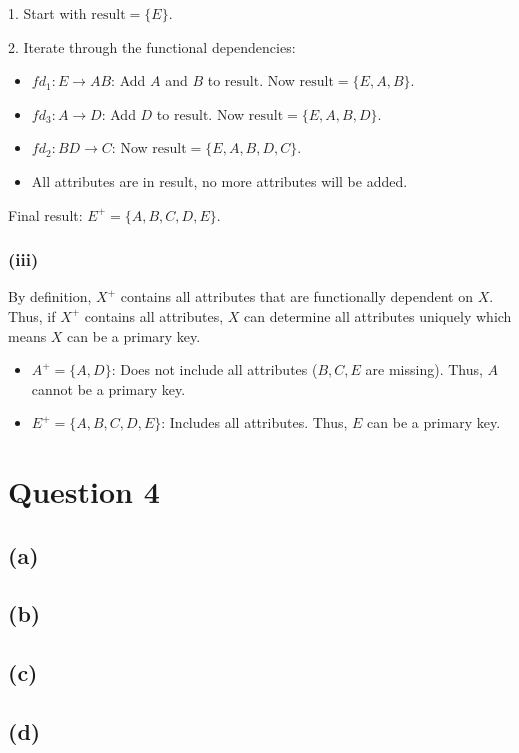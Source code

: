 \documentclass{article}
\begin{document}
1. Start with $ \text{result} = \{E\} $.

2. Iterate through the functional dependencies:
\begin{itemize}
  \item $ fd_1: E \to AB $: Add $ A $ and $ B $ to $ \text{result} $. Now $ \text{result} = \{E, A, B\} $.
  \item $ fd_3: A \to D $: Add $ D $ to $ \text{result} $. Now $ \text{result} = \{E, A, B, D\} $.
  \item $ fd_2: BD \to C $: Now $ \text{result} = \{E, A, B, D, C\} $.
  \item All attributes are in result, no more attributes will be added.
\end{itemize}
Final result: $ E^+ = \{A, B, C, D, E\} $.

\subsubsection*{(iii)}
By definition, $X^+$ contains all attributes that are functionally dependent on $X$. Thus, if $X^+$ contains all attributes, $X$ can determine all attributes uniquely which means $X$ can be a primary key.
\begin{itemize}
  \item $ A^+ = \{A, D\} $: Does not include all attributes ($ B, C, E $ are missing). Thus, $ A $ cannot be a primary key.
  \item $ E^+ = \{A, B, C, D, E\} $: Includes all attributes. Thus, $ E $ can be a primary key.
\end{itemize}

\newpage
\section*{Question 4}
\subsection*{(a)}

\subsection*{(b)}

\newpage
\subsection*{(c)}

\subsection*{(d)}

\newpage
\end{document}
